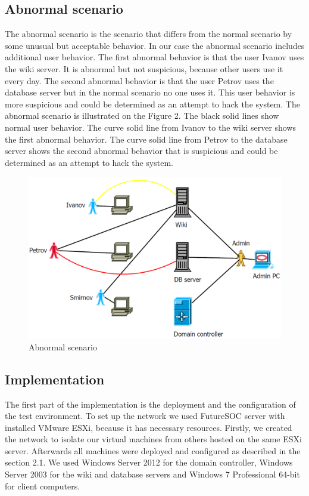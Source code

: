 \subsection{Abnormal scenario}
The abnormal scenario is the scenario that differs from the normal scenario by some unusual but acceptable behavior. In our case the abnormal scenario includes additional user behavior. The first abnormal behavior is that the user Ivanov uses the wiki server. It is abnormal but not suspicious, because other users use it every day. The second abnormal behavior is that the user Petrov uses the database server but in the normal scenario no one uses it. This user behavior is more suspicious and could be determined as an attempt to hack the system. The abnormal scenario is illustrated on the Figure 2. The black solid lines show normal user behavior. The curve solid line from Ivanov to the wiki server shows the first abnormal behavior. The curve solid line from Petrov to the database server shows the second abnormal behavior that is suspicious and could be determined as an attempt to hack the system. 
\begin{figure}[ht!]
\centering
\includegraphics[width=\textwidth]{scenario_abnormal.png}
\caption{Abnormal scenario}
\label{overflow}
\end{figure}

\subsection{Implementation}
The first part of the implementation is the deployment and the configuration of the test environment. To set up the network we used FutureSOC server with installed VMware ESXi, because it has necessary resources. Firstly, we created the network to isolate our virtual machines from others hosted on the same ESXi server. Afterwards all machines were deployed and configured as described in the section 2.1. We used Windows Server 2012 for the domain controller, Windows Server 2003 for the wiki and database servers and Windows 7 Professional 64-bit for client computers. 


